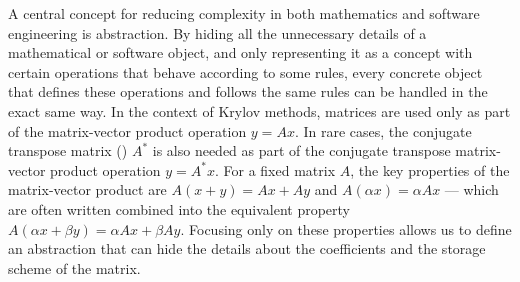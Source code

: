 A central concept for reducing complexity in both mathematics and software
engineering is abstraction. By hiding all the unnecessary details of a
mathematical or software object, and only representing it as a concept with
certain operations that behave according to some rules, every concrete object
that defines these operations and follows the same rules can be
handled in the exact same way. In the context of Krylov methods, matrices are
used only as part of the matrix-vector product operation $y = Ax$. In rare
cases, the conjugate transpose matrix () $A^*$ is also
needed as part of the conjugate transpose matrix-vector product operation $y =
A^*x$. For a fixed matrix $A$, the key properties of the matrix-vector product
are  $A(x+y) = Ax + Ay$ and 
$A(\alpha x) = \alpha Ax$ --- which are often written combined into the
equivalent  property $A(\alpha x + \beta y) = \alpha Ax +
\beta Ay$. Focusing only on these properties allows us to define an abstraction
that can hide the details about the coefficients and the storage scheme of the
matrix.

